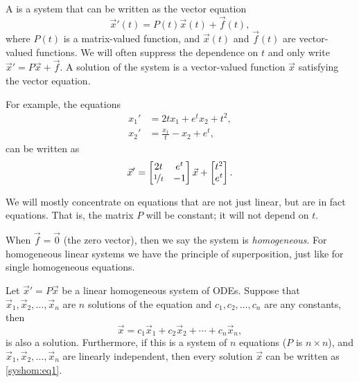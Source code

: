 A \emph{} is a system that can be
written as the vector equation
\begin{equation*}
{\vec{x}}'(t) = P(t)\vec{x}(t) + \vec{f}(t),
\end{equation*}
where $P(t)$ is a matrix-valued function,
and $\vec{x}(t)$ and $\vec{f}(t)$ are vector-valued functions.
We will often suppress the dependence on $t$ and
only write ${\vec{x}}' = P\vec{x} + \vec{f}$.  A solution of
the system is a vector-valued function
$\vec{x}$ satisfying the vector equation.

For example, the equations
\begin{align*}
x_1' &= 2t x_1 + e^t x_2 + t^2 , \\
x_2' &= \frac{x_1}{t} -x_2 + e^t ,
\end{align*}
can be written as
\begin{equation*}
{\vec{x}}' = 
\begin{bmatrix}
2t & e^t \\
\nicefrac{1}{t} & -1
\end{bmatrix}
\vec{x}
+
\begin{bmatrix}
t^2 \\
e^t
\end{bmatrix} .
\end{equation*}

We will mostly concentrate on equations that are not just linear, but are in
fact \emph{} equations.  That is, the matrix $P$ will
be constant; it will not depend on $t$.

\medskip

When $\vec{f} = \vec{0}$ (the zero vector), then we say the system is
\emph{homogeneous}.
For homogeneous linear systems we have the
principle of superposition, just like for single homogeneous equations.

\begin{theorem}[Superposition]
Let
${\vec{x}}' = P\vec{x}$ be a linear homogeneous system of ODEs.  Suppose
that $\vec{x}_1,\vec{x}_2,\ldots,\vec{x}_n$ are $n$ solutions of the equation
and $c_1,c_2,\ldots,c_n$ are any constants, then
\begin{equation} \label{syshom:eq1}
\vec{x} = c_1 \vec{x}_1 + c_2 \vec{x}_2 + \cdots + c_n \vec{x}_n ,
\end{equation}
is also a solution.
Furthermore, if this is a system of $n$ equations ($P$ is $n\times n$), and
$\vec{x}_1,\vec{x}_2,\ldots,\vec{x}_n$ are linearly independent, then every
solution  $\vec{x}$ can be written as \eqref{syshom:eq1}.
\end{theorem}

